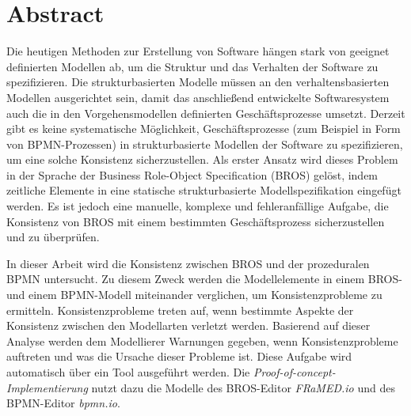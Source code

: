 \chapter*{Abstract}

Die heutigen Methoden zur Erstellung von Software hängen stark von geeignet definierten Modellen ab, um die Struktur und das Verhalten der Software zu spezifizieren.
Die strukturbasierten Modelle müssen an den verhaltensbasierten Modellen ausgerichtet sein, damit das anschließend entwickelte Softwaresystem auch die in den Vorgehensmodellen definierten Geschäftsprozesse umsetzt.
Derzeit gibt es keine systematische Möglichkeit, Geschäftsprozesse (zum Beispiel in Form von BPMN-Prozessen) in strukturbasierte Modellen der Software zu spezifizieren, um eine solche Konsistenz sicherzustellen.
Als erster Ansatz wird dieses Problem in der Sprache der Business Role-Object Specification (BROS) gelöst, indem zeitliche Elemente in eine statische strukturbasierte Modellspezifikation eingefügt werden.
Es ist jedoch eine manuelle, komplexe und fehleranfällige Aufgabe, die Konsistenz von BROS mit einem bestimmten Geschäftsprozess sicherzustellen und zu überprüfen.

In dieser Arbeit wird die Konsistenz zwischen BROS und der prozeduralen BPMN untersucht.
Zu diesem Zweck werden die Modellelemente in einem BROS- und einem BPMN-Modell miteinander verglichen, um Konsistenzprobleme zu ermitteln.
Konsistenzprobleme treten auf, wenn bestimmte Aspekte der Konsistenz zwischen den Modellarten verletzt werden.
Basierend auf dieser Analyse werden dem Modellierer Warnungen gegeben, wenn Konsistenzprobleme auftreten und was die Ursache dieser Probleme ist.
Diese Aufgabe wird automatisch über ein Tool ausgeführt werden. Die \emph{Proof-of-concept-Implementierung} nutzt dazu die Modelle des BROS-Editor \emph{FRaMED.io} und des BPMN-Editor \emph{bpmn.io}.
